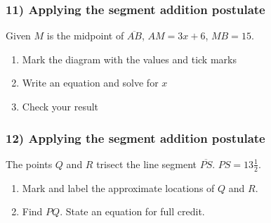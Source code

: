 \documentclass{beamer}
\begin{document}
  \frame
  {
    \frametitle{11) Applying the segment addition postulate}
    Given $M$ is the midpoint of $\overline{AB}$, $AM=3x+6$, $MB=15$.
    \begin{enumerate}
      \item Mark the diagram with the values and tick marks
      \item Write an equation and solve for $x$
      \item Check your result
    \end{enumerate} \vspace{1cm}
      \begin{center}
      \end{center} \vspace{4cm}
  }

  \frame
  {
    \frametitle{12) Applying the segment addition postulate}
      The points $Q$ and $R$ trisect the line segment $\overline{PS}$. $PS=13 \frac{1}{2}$.
      \begin{enumerate}
        \item Mark and label the approximate locations of $Q$ and $R$.
        \item Find ${PQ}$. State an equation for full credit.
      \end{enumerate} \vspace{1cm} 
      \begin{center}
      \end{center} \vspace{3cm} 
  }
\end{document}

